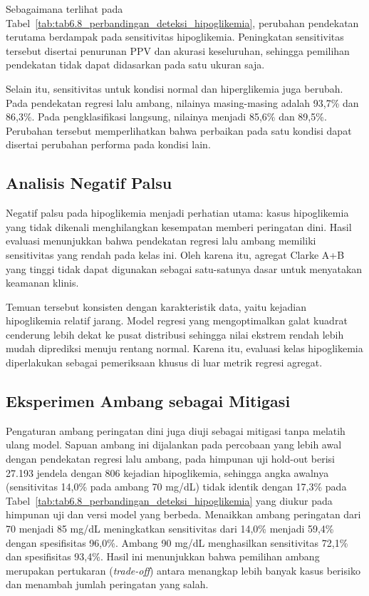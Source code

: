 Sebagaimana terlihat pada Tabel~\ref{tab:tab6.8_perbandingan_deteksi_hipoglikemia}, perubahan pendekatan terutama berdampak pada sensitivitas hipoglikemia.
Peningkatan sensitivitas tersebut disertai penurunan PPV dan akurasi keseluruhan, sehingga pemilihan pendekatan tidak dapat didasarkan pada satu ukuran
saja.

Selain itu, sensitivitas untuk kondisi normal dan hiperglikemia juga berubah. Pada pendekatan regresi lalu ambang, nilainya masing-masing adalah 93,7\% dan
86,3\%. Pada pengklasifikasi langsung, nilainya menjadi 85,6\% dan 89,5\%. Perubahan tersebut memperlihatkan bahwa perbaikan pada satu kondisi dapat
disertai perubahan performa pada kondisi lain.

\subsection{Analisis Negatif Palsu}
\label{subsec:bab6-analisis-false-negative-hipoglikemia}

Negatif palsu pada hipoglikemia menjadi perhatian utama: kasus hipoglikemia yang tidak dikenali menghilangkan kesempatan memberi peringatan dini. Hasil evaluasi menunjukkan bahwa pendekatan regresi lalu ambang memiliki sensitivitas yang rendah pada kelas ini. Oleh karena itu,
agregat Clarke A+B yang tinggi tidak dapat digunakan sebagai satu-satunya dasar untuk menyatakan keamanan klinis.

Temuan tersebut konsisten dengan karakteristik data, yaitu kejadian hipoglikemia relatif jarang. Model regresi yang mengoptimalkan galat kuadrat cenderung
lebih dekat ke pusat distribusi sehingga nilai ekstrem rendah lebih mudah diprediksi menuju rentang normal. Karena itu, evaluasi kelas hipoglikemia
diperlakukan sebagai pemeriksaan khusus di luar metrik regresi agregat.

\subsection{Eksperimen Ambang sebagai Mitigasi}
\label{subsec:bab6-eksperimen-threshold-mitigasi}

Pengaturan ambang peringatan dini juga diuji sebagai mitigasi tanpa melatih ulang model. Sapuan ambang ini dijalankan pada percobaan yang lebih awal
dengan pendekatan regresi lalu ambang, pada himpunan uji hold-out berisi 27.193 jendela dengan 806 kejadian hipoglikemia, sehingga angka awalnya
(sensitivitas 14,0\% pada ambang 70 mg/dL) tidak identik dengan 17,3\% pada Tabel~\ref{tab:tab6.8_perbandingan_deteksi_hipoglikemia} yang diukur pada
himpunan uji dan versi model yang berbeda. Menaikkan ambang peringatan dari 70 menjadi 85 mg/dL meningkatkan sensitivitas dari 14,0\% menjadi 59,4\%
dengan spesifisitas 96,0\%. Ambang 90 mg/dL menghasilkan sensitivitas 72,1\% dan spesifisitas 93,4\%. Hasil ini menunjukkan bahwa pemilihan ambang
merupakan pertukaran (\textit{trade-off}) antara menangkap lebih banyak kasus berisiko dan menambah jumlah peringatan yang salah.

